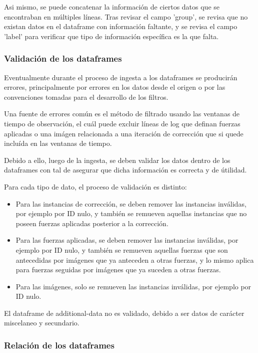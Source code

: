 Asi mismo, se puede concatenar la información de ciertos datos que se encontraban en múltiples líneas. Tras revisar el campo 'group', se revisa que no existan datos en el dataframe con información faltante, y se revisa el campo 'label' para verificar que tipo de información específica es la que falta.

\subsubsection{Validación de los dataframes}

Eventualmente durante el proceso de ingesta a los dataframes se producirán errores, principalmente por errores en los datos desde el origen o por las convenciones tomadas para el desarrollo de los filtros.

Una fuente de errores común es el método de filtrado usando las ventanas de tiempo de observación, el cuál puede excluir líneas de log que definan fuerzas aplicadas o una imágen relacionada a una iteración de corrección que si quede incluída en las ventanas de tiempo.

Debido a ello, luego de la ingesta, se deben validar los datos dentro de los dataframes con tal de asegurar que dicha información es correcta y de útilidad.

Para cada tipo de dato, el proceso de validación es distinto:

\begin{itemize}
    \item Para las instancias de corrección, se deben remover las instancias inválidas, por ejemplo por ID nulo, y también se remueven aquellas instancias que no poseen fuerzas aplicadas posterior a la corrección.

    \item Para las fuerzas aplicadas, se deben remover las instancias inválidas, por ejemplo por ID nulo, y también se remueven aquellas fuerzas que son antecedidas por imágenes que ya anteceden a otras fuerzas, y lo mismo aplica para fuerzas seguidas por imágenes que ya suceden a otras fuerzas.

    \item Para las imágenes, solo se remueven las instancias inválidas, por ejemplo por ID nulo.
\end{itemize}

El dataframe de additional-data no es validado, debido a ser datos de carácter miscelaneo y secundario.

\subsubsection{Relación de los dataframes}

